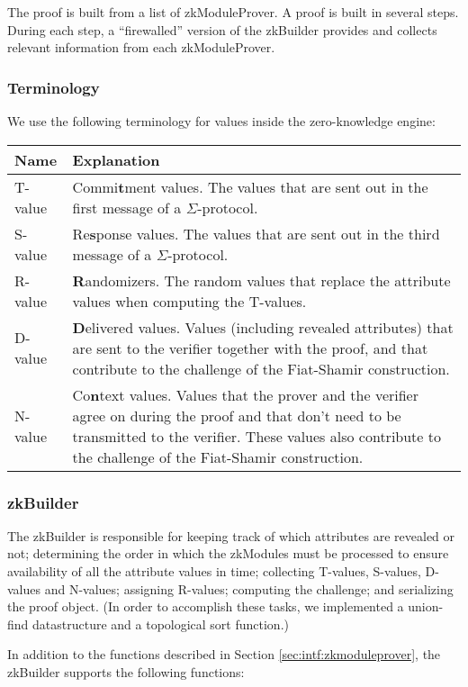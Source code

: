   The proof is built from a list of zkModuleProver. A proof is built in several steps. During each step, a ``firewalled'' version
  of the zkBuilder provides and collects relevant information from each zkModuleProver.

  \subsubsection{Terminology}
  \label{zkproof:terminology}
  We use the following terminology for values inside the zero-knowledge engine:

  \begin{tabular}{|l|p{}|}\hline
  \textbf{Name} & \textbf{Explanation} \\\hline
  T-value & Commi\textbf{t}ment values. The values that are sent out in the first message of a $\Sigma$-protocol.\\\hline
  S-value & Re\textbf{s}ponse values. The values that are sent out in the third message of a $\Sigma$-protocol.\\\hline
  R-value & \textbf{R}andomizers. The random values that replace the attribute values when computing the T-values.\\\hline
  D-value & \textbf{D}elivered values. Values (including revealed attributes) that are sent to the verifier together with the proof,
  and that contribute to the challenge of the Fiat-Shamir construction.\\\hline
  N-value & Co\textbf{n}text values. Values that the prover and the verifier agree on during the proof and that don't need to
  be transmitted to the verifier. These values also contribute to the challenge of the Fiat-Shamir construction.\\\hline
  \end{tabular}

  \subsubsection{zkBuilder}
  The zkBuilder is responsible for keeping track of which attributes are revealed or not; determining the order in which the
  zkModules must be processed to ensure availability of all the attribute values in time; collecting T-values, S-values,
  D-values and N-values; assigning R-values; computing the challenge;
  and serializing the proof object. (In order to accomplish these tasks, we implemented a union-find datastructure and a topological sort function.)

  In addition to the functions described in Section \ref{sec:intf:zkmoduleprover}, the zkBuilder supports the following functions:

